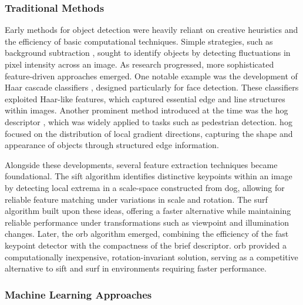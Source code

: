 \subsubsection{Traditional Methods}
\label{subsubsec:2_traditional}
Early methods for object detection were heavily reliant on creative heuristics and the efficiency of basic computational techniques. Simple strategies, such as background subtraction \cite{garcia2020background}, sought to identify objects by detecting fluctuations in pixel intensity across an image. As research progressed, more sophisticated feature-driven approaches emerged. One notable example was the development of Haar cascade classifiers \cite{vinh2020real, javed2022human}, designed particularly for face detection. These classifiers exploited Haar-like features, which captured essential edge and line structures within images.
Another prominent method introduced at the time was the \gls{hog} descriptor \cite{dalal2005histograms, bhattarai2023histogram}, which was widely applied to tasks such as pedestrian detection. \gls{hog} focused on the distribution of local gradient directions, capturing the shape and appearance of objects through structured edge information.

Alongside these developments, several feature extraction techniques became foundational. The \gls{sift} \cite{lowe2004distinctive} algorithm identifies distinctive keypoints within an image by detecting local extrema in a scale-space constructed from \gls{dog}, allowing for reliable feature matching under variations in scale and rotation. The \gls{surf} algorithm \cite{bay2006surf} built upon these ideas, offering a faster alternative while maintaining reliable performance under transformations such as viewpoint and illumination changes.
Later, the \gls{orb} algorithm \cite{rublee2011orb} emerged, combining the efficiency of the \gls{fast} keypoint detector with the compactness of the \gls{brief} descriptor. \gls{orb} provided a computationally inexpensive, rotation-invariant solution, serving as a competitive alternative to \gls{sift} and \gls{surf} in environments requiring faster performance.

\subsubsection{Machine Learning Approaches}
\label{subsubsec:2_machine_learning}

